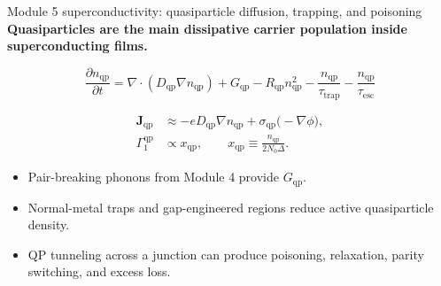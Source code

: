 \documentclass[aspectratio=169,10pt]{beamer}
\begin{document}
\begin{frame}{Module 5 superconductivity: quasiparticle diffusion, trapping, and poisoning}
\footnotesize
\textbf{Quasiparticles are the main dissipative carrier population inside superconducting films.}

\vspace{-0.15em}
\begin{equation*}
\boxed{
\frac{\partial n_{\mathrm{qp}}}{\partial t}
=\nabla\cdot(D_{\mathrm{qp}}\nabla n_{\mathrm{qp}})
+G_{\mathrm{qp}}
-R_{\mathrm{qp}}n_{\mathrm{qp}}^2
-\frac{n_{\mathrm{qp}}}{\tau_{\mathrm{trap}}}
-\frac{n_{\mathrm{qp}}}{\tau_{\mathrm{esc}}}
}
\end{equation*}

\vspace{-0.2em}
\begin{align*}
\mathbf J_{\mathrm{qp}}&\approx -eD_{\mathrm{qp}}\nabla n_{\mathrm{qp}}+\sigma_{\mathrm{qp}}\big(-\nabla\phi\big),\\[-0.05em]
\Gamma_1^{\mathrm{qp}}&\propto x_{\mathrm{qp}},
\qquad
x_{\mathrm{qp}}\equiv \frac{n_{\mathrm{qp}}}{2N_0\Delta}.
\end{align*}

\vspace{-0.25em}
\begin{itemize}
    \item Pair-breaking phonons from Module 4 provide $G_{\mathrm{qp}}$.
    \item Normal-metal traps and gap-engineered regions reduce active quasiparticle density.
    \item QP tunneling across a junction can produce poisoning, relaxation, parity switching, and excess loss.
\end{itemize}
\end{frame}
\end{document}
